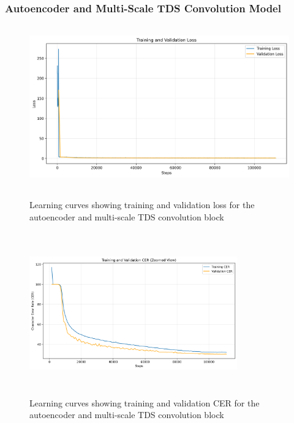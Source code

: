 \subsubsection{Autoencoder and Multi-Scale TDS Convolution Model}
\begin{figure}[h]
    \centering
    \begin{minipage}{0.48\textwidth}
        \centering
        \includegraphics[height=7cm,width=\textwidth]{../results/model-multi-scale-autoencoder-tiny/loss_plot.png}
        \caption{Learning curves showing training and validation loss for the autoencoder and multi-scale TDS convolution block}
        \label{fig:autoencoder_multi_scale_loss}
    \end{minipage}
    \hfill
    \begin{minipage}{0.48\textwidth}
        \centering
        \includegraphics[height=7cm, width=0.8\textwidth]{../results/model-multi-scale-autoencoder-tiny/cer_zoomed_plot.png}
        \caption{Learning curves showing training and validation CER for the autoencoder and multi-scale TDS convolution block}
        \label{fig:autoencoder_multi_scale_cer}
    \end{minipage}
\end{figure}

